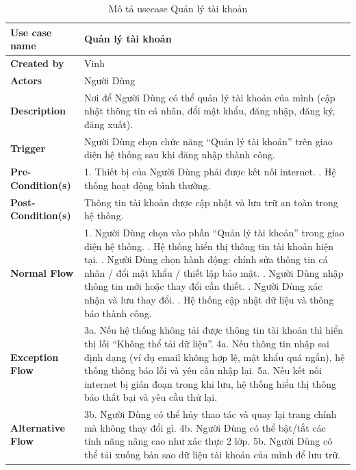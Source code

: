 \documentclass[a4paper]{article}
\begin{document}
\begin{table}[h!]
\centering
\renewcommand{\arraystretch}{1.3} %
\begin{tabularx}{\textwidth}{|l|X|}
\hline
\textbf{Use case name} & Quản lý tài khoản \\ \hline
\textbf{Created by}    & Vinh \\ \hline
\textbf{Actors}        & Người Dùng \\ \hline
\textbf{Description}   & Nơi để Người Dùng có thể quản lý tài khoản của mình (cập nhật thông tin cá nhân, đổi mật khẩu, đăng nhập, đăng ký, đăng xuất). \\ \hline
\textbf{Trigger}       & Người Dùng chọn chức năng “Quản lý tài khoản” trên giao diện hệ thống sau khi đăng nhập thành công. \\ \hline
\textbf{Pre-Condition(s)} 
& 1. Thiết bị của Người Dùng phải được kết nối internet. \newline
  2. Hệ thống hoạt động bình thường. \\ \hline
\textbf{Post-Condition(s)} 
& Thông tin tài khoản được cập nhật và lưu trữ an toàn trong hệ thống. \\ \hline
\textbf{Normal Flow}   
& 1. Người Dùng chọn vào phần “Quản lý tài khoản” trong giao diện hệ thống. \newline
  2. Hệ thống hiển thị thông tin tài khoản hiện tại. \newline
  3. Người Dùng chọn hành động: chỉnh sửa thông tin cá nhân / đổi mật khẩu / thiết lập bảo mật. \newline
  4. Người Dùng nhập thông tin mới hoặc thay đổi cần thiết. \newline
  5. Người Dùng xác nhận và lưu thay đổi. \newline
  6. Hệ thống cập nhật dữ liệu và thông báo thành công. \\ \hline
\textbf{Exception Flow} 
& 3a. Nếu hệ thống không tải được thông tin tài khoản thì hiển thị lỗi “Không thể tải dữ liệu”. \newline
  4a. Nếu thông tin nhập sai định dạng (ví dụ email không hợp lệ, mật khẩu quá ngắn), hệ thống thông báo lỗi và yêu cầu nhập lại. \newline
  5a. Nếu kết nối internet bị gián đoạn trong khi lưu, hệ thống hiển thị thông báo thất bại và yêu cầu thử lại. \\ \hline
\textbf{Alternative Flow} 
& 3b. Người Dùng có thể hủy thao tác và quay lại trang chính mà không thay đổi gì. \newline
  4b. Người Dùng có thể bật/tắt các tính năng nâng cao như xác thực 2 lớp. \newline
  5b. Người Dùng có thể tải xuống bản sao dữ liệu tài khoản của mình để lưu trữ. \\ \hline
\end{tabularx}
\caption{Mô tả usecase Quản lý tài khoản}
\end{table}
\end{document}
